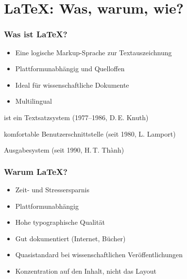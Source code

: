 \begin{frame}
  \titlepage{}
\end{frame}

\section{\LaTeX{}: Was, warum, wie?}

\begin{frame}
    \frametitle{Was ist \LaTeX{}?}
    \begin{itemize}
        \item Eine logische Markup-Sprache zur Textauszeichnung
        \item Plattformunabhängig und Quelloffen
        \item Ideal für wissenschaftliche Dokumente
        \item Multilingual
    \end{itemize}
    \begin{description}
        \item [\TeX] ist ein Textsatzsystem (1977--1986, D.\,E. Knuth)
        \item [\LaTeX] komfortable Benutzerschnittstelle (seit 1980, L.
        Lamport)
        \item [pdf\TeX] Ausgabesystem (seit 1990, H.\,T. Thành)
    \end{description}
\end{frame}

\begin{frame}
    \frametitle{Warum \LaTeX?}
    \begin{itemize}
        \item Zeit- und Stressersparnis
        \item Plattformunabhängig
        \item Hohe typographische Qualität
        \item Gut dokumentiert (Internet, Bücher)
        \item Quasistandard bei wissenschaftlichen Veröffentlichungen
        \item Konzentration auf den Inhalt, nicht das Layout
    \end{itemize}
\end{frame}

